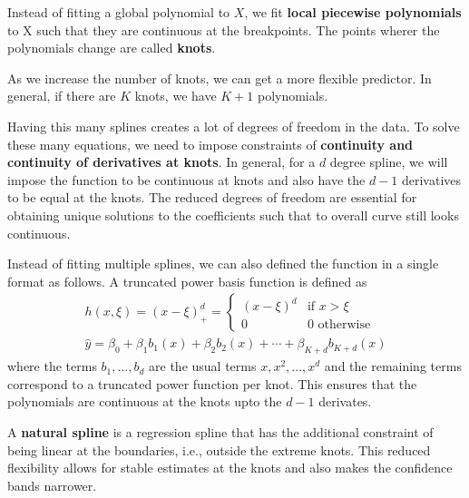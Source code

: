 \documentclass[../statistical_learning_notes.tex]{subfiles}
\begin{document}
    Instead of fitting a global polynomial to $X$, we fit \textbf{local piecewise polynomials} to X such that they are continuous at the breakpoints. The points wherer the polynomials change are called \textbf{knots}.\newline

    As we increase the number of knots, we can get a more flexible predictor. In general, if there are $K$ knots, we have $K+1$ polynomials.\newline

    Having this many splines creates a lot of degrees of freedom in the data. To solve these many equations, we need to impose constraints of \textbf{continuity and continuity of derivatives at knots}. In general, for a $d$ degree spline, we will impose the function to be continuous at knots and also have the $d-1$ derivatives to be equal at the knots. The reduced degrees of freedom are essential for obtaining unique solutions to the coefficients such that to overall curve still looks continuous.\newline

    Instead of fitting multiple splines, we can also defined the function in a single format as follows. A truncated power basis function is defined as
    \begin{align*}
        h(x, \xi) = (x - \xi)_{+}^{d} = \begin{cases} (x-\xi)^{d} &\mbox{if $x > \xi$}\\
            0 &\mbox{$0$ otherwise} \end{cases}\\
        \hat{y} = \beta_{0} + \beta_{1}b_{1}(x) + \beta_{2}b_{2}(x) + \cdots + \beta_{K+d}b_{K+d}(x)
    \end{align*}
    where the terms $b_{1},\ldots,b_{d}$ are the usual terms $x, x^{2}, \ldots, x^{d}$ and the remaining terms correspond to a truncated power function per knot. This ensures that the polynomials are continuous at the knots upto the $d-1$ derivates.\newline

    A \hypertarget{naturalsplines}{\textbf{natural spline}} is a regression spline that has the additional constraint of being linear at the boundaries, i.e., outside the extreme knots. This reduced flexibility allows for stable estimates at the knots and also makes the confidence bands narrower.

\end{document}
